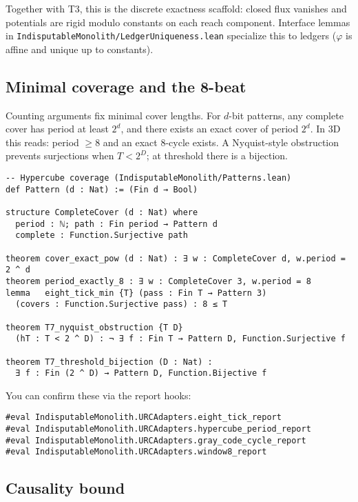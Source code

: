 \documentclass[11pt,a4paper,twoside]{article}
\numberwithin{equation}{section}
\renewcommand{\phi}{\varphi}
\theoremstyle{customthm}
\theoremstyle{customdef}
\theoremstyle{customrem}
\begin{document}
Together with T3, this is the discrete exactness scaffold: closed flux vanishes and potentials are rigid modulo constants on each reach component. Interface lemmas in \texttt{IndisputableMonolith/LedgerUniqueness.lean} specialize this to ledgers ($\phi$ is affine and unique up to constants).

\subsection{Minimal coverage and the 8-beat}

Counting arguments fix minimal cover lengths. For $d$-bit patterns, any complete cover has period at least $2^d$, and there exists an exact cover of period $2^d$. In 3D this reads: period $\ge 8$ and an exact 8-cycle exists. A Nyquist-style obstruction prevents surjections when $T<2^D$; at threshold there is a bijection.

\begin{lstlisting}
-- Hypercube coverage (IndisputableMonolith/Patterns.lean)
def Pattern (d : Nat) := (Fin d → Bool)

structure CompleteCover (d : Nat) where
  period : ℕ; path : Fin period → Pattern d
  complete : Function.Surjective path

theorem cover_exact_pow (d : Nat) : ∃ w : CompleteCover d, w.period = 2 ^ d
theorem period_exactly_8 : ∃ w : CompleteCover 3, w.period = 8
lemma   eight_tick_min {T} (pass : Fin T → Pattern 3)
  (covers : Function.Surjective pass) : 8 ≤ T

theorem T7_nyquist_obstruction {T D}
  (hT : T < 2 ^ D) : ¬ ∃ f : Fin T → Pattern D, Function.Surjective f

theorem T7_threshold_bijection (D : Nat) :
  ∃ f : Fin (2 ^ D) → Pattern D, Function.Bijective f
\end{lstlisting}

You can confirm these via the report hooks:

\begin{lstlisting}
#eval IndisputableMonolith.URCAdapters.eight_tick_report
#eval IndisputableMonolith.URCAdapters.hypercube_period_report
#eval IndisputableMonolith.URCAdapters.gray_code_cycle_report
#eval IndisputableMonolith.URCAdapters.window8_report
\end{lstlisting}

\subsection{Causality bound}
\end{document}
